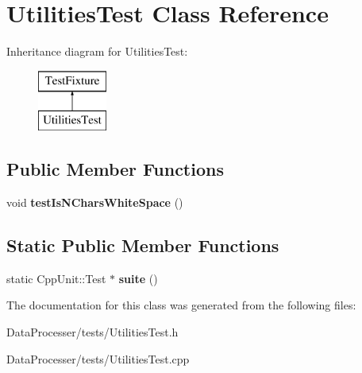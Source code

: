 \hypertarget{classUtilitiesTest}{}\section{Utilities\+Test Class Reference}
\label{classUtilitiesTest}
Inheritance diagram for Utilities\+Test\+:\begin{figure}[H]
\begin{center}
\leavevmode
\includegraphics[height=2.000000cm]{classUtilitiesTest}
\end{center}
\end{figure}
\subsection*{Public Member Functions}
\begin{DoxyCompactItemize}
\item 
\mbox{\label{classUtilitiesTest_abeeace607b8a06666d96e5951f05342e}} 
void {\bfseries test\+Is\+N\+Chars\+White\+Space} ()
\end{DoxyCompactItemize}
\subsection*{Static Public Member Functions}
\begin{DoxyCompactItemize}
\item 
\mbox{\label{classUtilitiesTest_ab91622376f6d0c0b66279b34fbbf5024}} 
static Cpp\+Unit\+::\+Test $\ast$ {\bfseries suite} ()
\end{DoxyCompactItemize}


The documentation for this class was generated from the following files\+:\begin{DoxyCompactItemize}
\item 
Data\+Processer/tests/Utilities\+Test.\+h\item 
Data\+Processer/tests/Utilities\+Test.\+cpp\end{DoxyCompactItemize}
